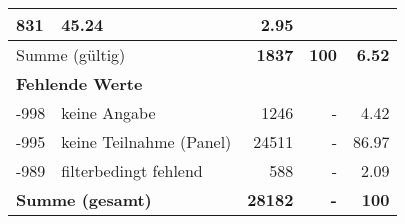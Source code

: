 \begin{longtable}{lXrrr}
       \num{831} &
       \num[round-mode=places,round-precision=2]{45.24} &
         \num[round-mode=places,round-precision=2]{2.95} \\
     \midrule
     \multicolumn{2}{l}{Summe (gültig)} &
       \textbf{\num{1837}} &
     \textbf{\num{100}} &
       \textbf{\num[round-mode=places,round-precision=2]{6.52}} \\
     \multicolumn{5}{l}{\textbf{Fehlende Werte}}\\
       -998 &
       keine Angabe &
         \num{1246} &
        - &
         \num[round-mode=places,round-precision=2]{4.42} \\
       -995 &
       keine Teilnahme (Panel) &
         \num{24511} &
        - &
         \num[round-mode=places,round-precision=2]{86.97} \\
       -989 &
       filterbedingt fehlend &
         \num{588} &
        - &
         \num[round-mode=places,round-precision=2]{2.09} \\
     \midrule
     \multicolumn{2}{l}{\textbf{Summe (gesamt)}} &
          \textbf{\num{28182}} &
        \textbf{-} &
        \textbf{\num{100}} \\
     \bottomrule
     \end{longtable}
     
